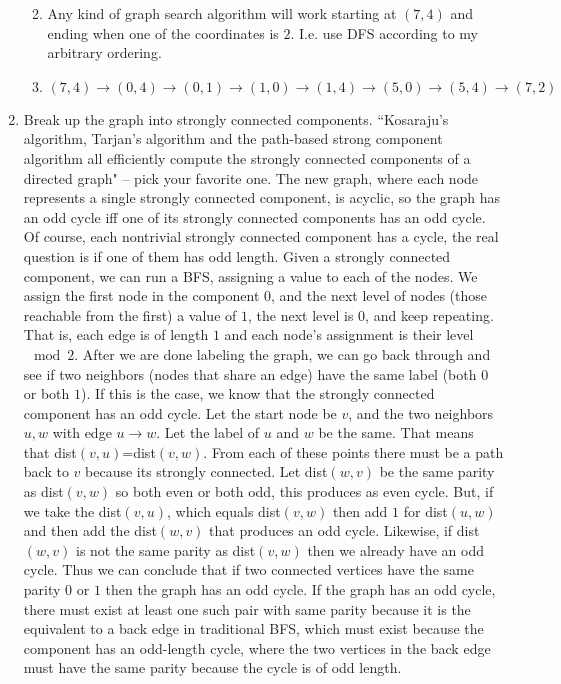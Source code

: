 \documentclass[11pt]{article}
\begin{document}
\begin{enumerate}
\begin{enumerate}
\item Any kind of graph search algorithm will work starting at $(7,4)$ and ending when one of the coordinates is $2$. I.e. use DFS according to my arbitrary ordering.
\item $$(7,4)\to(0,4)\to(0,1)\to(1,0)\to(1,4)\to(5,0)\to(5,4)\to(7,2)$$
\end{enumerate}
\newpage
\item Break up the graph into strongly connected components. ``Kosaraju's algorithm, Tarjan's algorithm and the path-based strong component algorithm all efficiently compute the strongly connected components of a directed graph" -- pick your favorite one. The new graph, where each node represents a single strongly connected component, is acyclic, so the graph has an odd cycle iff one of its strongly connected components has an odd cycle. Of course, each nontrivial strongly connected component has a cycle, the real question is if one of them has odd length. Given a strongly connected component, we can run a BFS, assigning a value to each of the nodes. We assign the first node in the component $0$, and the next level of nodes (those reachable from the first) a value of $1$, the next level is $0$, and keep repeating. That is, each edge is of length $1$ and each node's assignment is their level $\mod 2$. After we are done labeling the graph, we can go back through and see if two neighbors (nodes that share an edge) have the same label (both $0$ or both $1$). If this is the case, we know that the strongly connected component has an odd cycle. Let the start node be $v$, and the two neighbors $u,w$ with edge $u\to w$. Let the label of $u$ and $w$ be the same. That means that dist$(v,u)$=dist$(v,w)$. From each of these points there must be a path back to $v$ because its strongly connected. Let dist$(w,v)$ be the same parity as dist$(v,w)$ so both even or both odd, this produces as even cycle. But, if we take the dist$(v,u)$, which equals dist$(v,w)$ then add $1$ for dist$(u,w)$ and then add the dist$(w,v)$ that produces an odd cycle. Likewise, if dist$(w,v)$ is not the same parity as dist$(v,w)$ then we already have an odd cycle. Thus we can conclude that if two connected vertices have the same parity $0$ or $1$ then the graph has an odd cycle. If the graph has an odd cycle, there must exist at least one such pair with same parity because it is the equivalent to a back edge in traditional BFS, which must exist because the component has an odd-length cycle, where the two vertices in the back edge must have the same parity because the cycle is of odd length. \\


\end{enumerate}
\end{document}
